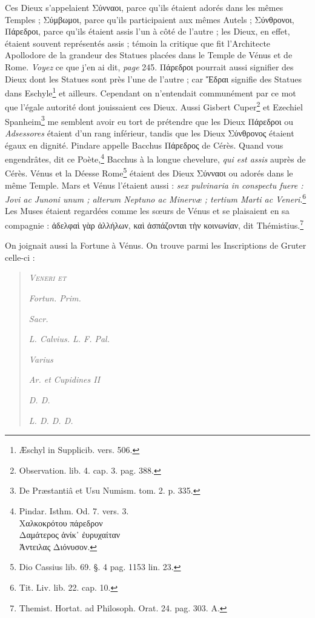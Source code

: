 \documentclass[a4paper, 18pt, oneside]{article}
\begin{document}
Ces Dieux s'appelaient Σύνναοι, parce qu'ils étaient adorés dans les mêmes Temples ; Σύμβωμοι, parce qu'ils participaient aux mêmes Autels ; Σύνθρονοι, Πάρεδροι, parce qu'ils étaient assis l'un à côté de l'autre ; les Dieux, en effet, étaient souvent représentés assis ; témoin la critique que fit l'Architecte Apollodore de la grandeur des Statues placées dans le Temple de Vénus et de Rome. \emph{Voyez} ce que j'en ai dit, \emph{page} 245. Πάρεδροι pourrait aussi signifier des Dieux dont les Statues sont près l'une de l'autre ; car Ἔδραι signifie des Statues dans Eschyle\footnote{Æschyl in Supplicib. vers. 506.} et ailleurs. Cependant on n'entendait communément par ce mot que l'égale autorité dont jouissaient ces Dieux. Aussi Gisbert Cuper\footnote{Observation. lib. 4. cap. 3. pag. 388.} et Ezechiel Spanheim\footnote{De Præstantiâ et Usu Numism. tom. 2. p. 335.} me semblent avoir eu tort de prétendre que les Dieux Πάρεδροι ou \emph{Adsessores} étaient d'un rang inférieur, tandis que les Dieux Σύνθρονος étaient égaux en dignité. Pindare appelle Bacchus Πάρεδρος de Cérès. Quand vous engendrâtes, dit ce Poète,\footnote{Pindar. Isthm. Od. 7. vers. 3.\\\hspace*{15mm}Χαλκοκρότου πάρεδρον\\\hspace*{5mm}Δαμάτερος ἁνίκ᾽ ἐυρυχαίταν\\\hspace*{5mm}Ἀντειλας Διόνυσον.} Bacchus à la longue chevelure, \emph{qui est assis} auprès de Cérès. Vénus et la Déesse Rome\footnote{Dio Cassius lib. 69. §. 4 pag. 1153 lin. 23.} étaient des Dieux Σύνναοι ou adorés dans le même Temple. Mars et Vénus l'étaient aussi : \emph{sex pulvinaria in conspectu fuere : Jovi ac Junoni unum ; alterum Neptuno ac Minervæ ; tertium Marti ac Veneri}.\footnote{Tit. Liv. lib. 22. cap. 10.} Les Muses étaient regardées comme les sœurs de Vénus et se plaisaient en sa compagnie : ἀδελφαὶ γὰρ ἀλλήλων, καὶ ἀσπάζονται τὴν κοινωνίαν, dit Thémistius.\footnote{Themist. Hortat. ad Philosoph. Orat. 24. pag. 303. A.}

On joignait aussi la Fortune à Vénus. On trouve parmi les Inscriptions de Gruter celle-ci :
\begin{quotation}
\scshape
\hspace*{5mm}\emph{Veneri et}

\emph{Fortun. Prim.}

\hspace*{15mm}\emph{Sacr.}

\emph{L. Calvius. L. F. Pal.}

\hspace*{15mm}\emph{Varius}

\emph{Ar. et Cupidines II}

\hspace*{15mm}\emph{D. D.}

\hspace*{5mm}\emph{L. D. D. D.}
\end{quotation}
\end{document}

